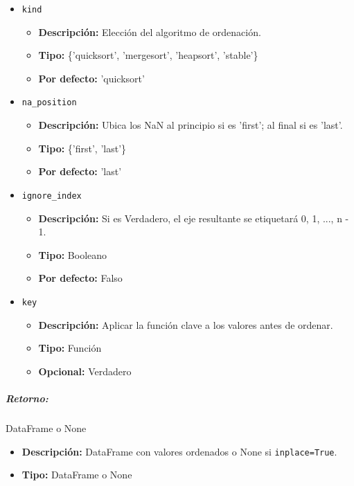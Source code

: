 \begin{itemize}
    \item \texttt{kind}
          \begin{itemize}
              \item \textbf{Descripción:} Elección del algoritmo de ordenación.
              \item \textbf{Tipo:} \{'quicksort', 'mergesort', 'heapsort',
                    'stable'\}
              \item \textbf{Por defecto:} 'quicksort'
          \end{itemize}

    \item \texttt{na\_position}
          \begin{itemize}
              \item \textbf{Descripción:} Ubica los NaN al principio si es
                    'first'; al final si es 'last'.
              \item \textbf{Tipo:} \{'first', 'last'\}
              \item \textbf{Por defecto:} 'last'
          \end{itemize}

    \item \texttt{ignore\_index}
          \begin{itemize}
              \item \textbf{Descripción:} Si es Verdadero, el eje resultante se
                    etiquetará 0, 1, ..., n - 1.
              \item \textbf{Tipo:} Booleano
              \item \textbf{Por defecto:} Falso
          \end{itemize}

    \item \texttt{key}
          \begin{itemize}
              \item \textbf{Descripción:} Aplicar la función clave a los
                    valores antes de ordenar.
              \item \textbf{Tipo:} Función
              \item \textbf{Opcional:} Verdadero
          \end{itemize}
\end{itemize}

\subparagraph{Retorno:} DataFrame o None
\begin{itemize}
    \item \textbf{Descripción:} DataFrame con valores ordenados o None si
          \texttt{inplace=True}.
    \item \textbf{Tipo:} DataFrame o None
\end{itemize}

